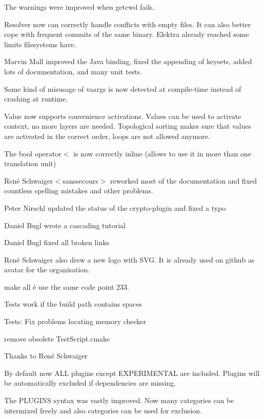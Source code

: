 The warnings were improved when {\ttfamily getcwd} fails.

Resolver now can correctly handle conflicts with empty files. It can also better cope with frequent commits of the same binary. Elektra already reached some limits filesystems have.

Marvin Mall improved the Java binding, fixed the appending of keysets, added lots of documentation, and many unit tests.

Some kind of misusage of vaargs is now detected at compile-\/time instead of crashing at runtime.

Value now supports convenience activations. Values can be used to activate context, no more layers are needed. Topological sorting makes sure that values are activated in the correct order, loops are not allowed anymore.

The {\ttfamily bool operator$<$} is now correctly inline (allows to use it in more than one translation unit)

René Schwaiger$<$sanssecours$>$ reworked most of the documentation and fixed countless spelling mistakes and other problems.


\begin{DoxyItemize}
\item Peter Nirschl updated the status of the crypto-\/plugin and fixed a typo
\item Daniel Bugl wrote a cascading tutorial
\item Daniel Bugl fixed all broken links
\item René Schwaiger also drew a new logo with S\+VG. It is already used on github as avatar for the organisation.
\item make all é use the same code point 233.
\end{DoxyItemize}


\begin{DoxyItemize}
\item Tests work if the build path contains spaces
\item Tests\+: Fix problems locating memory checker
\item remove obsolete Test\+Script.\+cmake
\end{DoxyItemize}

Thanks to René Schwaiger

By default now A\+LL plugins except E\+X\+P\+E\+R\+I\+M\+E\+N\+T\+AL are included. Plugins will be automatically excluded if dependencies are missing.

The P\+L\+U\+G\+I\+NS syntax was vastly improved. Now many categories can be intermixed freely and also categories can be used for exclusion.

